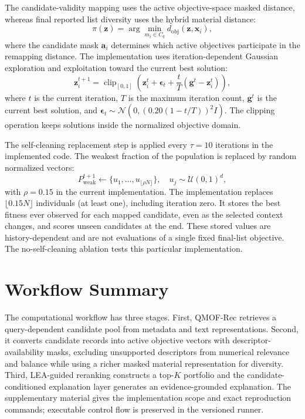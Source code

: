 \documentclass[12pt,a4paper]{article}
\begin{document}
The candidate-validity mapping uses the active objective-space masked distance, whereas final reported list diversity uses the hybrid material distance:
\begin{equation}
  \pi(\mathbf{z}) = \arg\min_{m_i \in C_q}d_{\mathrm{obj}}(\mathbf{z},\mathbf{x}_i),
\end{equation}
where the candidate mask $\mathbf{a}_i$ determines which active objectives participate in the remapping distance. The implementation uses iteration-dependent Gaussian exploration and exploitation toward the current best solution:
\begin{equation}
  \mathbf{z}_i^{t+1} =
  \operatorname{clip}_{[0,1]}\!\left(\mathbf{z}_i^t
  + \boldsymbol{\epsilon}_t
  + \frac{t}{T}(\mathbf{g}^t-\mathbf{z}_i^t)\right),
\end{equation}
where $t$ is the current iteration, $T$ is the maximum iteration count, $\mathbf{g}^t$ is the current best solution, and $\boldsymbol{\epsilon}_t \sim \mathcal{N}(0,(0.20(1-t/T))^2I)$. The clipping operation keeps solutions inside the normalized objective domain.

The self-cleaning replacement step is applied every $\tau = 10$ iterations in the implemented code. The weakest fraction of the population is replaced by random normalized vectors:
\begin{equation}
  P^{t+1}_{\mathrm{weak}} \leftarrow \{u_1,\ldots,u_{\lfloor\rho N\rfloor}\},\quad u_j \sim \mathcal{U}(0,1)^d,
\end{equation}
with $\rho = 0.15$ in the current implementation. The implementation replaces $\lfloor0.15N\rfloor$ individuals (at least one), including iteration zero. It stores the best fitness ever observed for each mapped candidate, even as the selected context changes, and scores unseen candidates at the end. These stored values are history-dependent and are not evaluations of a single fixed final-list objective. The no-self-cleaning ablation tests this particular implementation.

\section{Workflow Summary}
\label{sec:algorithms}

The computational workflow has three stages. First, QMOF-Rec retrieves a query-dependent candidate pool from metadata and text representations. Second, it converts candidate records into active objective vectors with descriptor-availability masks, excluding unsupported descriptors from numerical relevance and balance while using a richer masked material representation for diversity. Third, LEA-guided reranking constructs a top-$K$ portfolio and the candidate-conditioned explanation layer generates an evidence-grounded explanation. The supplementary material gives the implementation scope and exact reproduction commands; executable control flow is preserved in the versioned runner.
\end{document}
